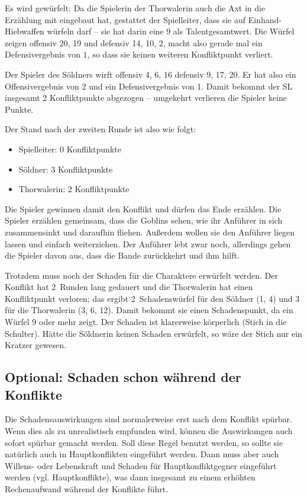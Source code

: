 \begin{beispiel}
\begin{description}
Es wird gewürfelt: Da die Spielerin der Thorwalerin auch die Axt in die Erzählung mit eingebaut hat, gestattet der Spielleiter, dass sie auf Einhand-Hiebwaffen würfeln darf -- sie hat darin eine 9 als Talentgesamtwert. Die Würfel zeigen offensiv 20, 19 und defensiv 14, 10, 2, macht also gerade mal ein Defensivergebnis von $1$, so dass sie keinen weiteren Konfliktpunkt verliert.

Der Spieler des Söldners wirft offensiv 4, 6, 16 defensiv 9, 17, 20. Er hat also ein Offensivergebnis von 2 und ein Defensivergebnis von 1. Damit bekommt der SL insgesamt 2 Konfliktpunkte abgezogen -- umgekehrt verlieren die Spieler keine Punkte.

Der Stand nach der zweiten Runde ist also wie folgt:
\begin{itemize}
\item Spielleiter: 0 Konfliktpunkte
\item Söldner: 3 Konfliktpunkte
\item Thorwalerin: 2 Konfliktpunkte
\end{itemize}
\end{description}

Die Spieler gewinnen damit den Konflikt und dürfen das Ende erzählen. Die Spieler erzählen gemeinsam, dass die Goblins sehen, wie ihr Anführer in sich zusammensinkt und daraufhin fliehen. Außerdem wollen sie den Anführer liegen lassen und einfach weiterziehen. Der Anführer lebt zwar noch, allerdings gehen die Spieler davon aus, dass die Bande zurückkehrt und ihm hilft.

Trotzdem muss noch der Schaden für die Charaktere erwürfelt werden. Der Konflikt hat 2~Runden lang gedauert und die Thorwalerin hat einen Konfliktpunkt verloren; das ergibt 2~Schadenswürfel für den Söldner (1, 4) und 3 für die Thorwalerin (3, 6, 12). Damit bekommt sie einen Schadenspunkt, da ein Würfel 9 oder mehr zeigt. Der Schaden ist klarerweise körperlich (Stich in die Schulter). Hätte die Söldnerin keinen Schaden erwürfelt, so wäre der Stich nur ein Kratzer gewesen.
\end{beispiel}

\begin{optional}
\section{Optional: Schaden schon während der Konflikte}
Die Schadensauswirkungen sind normalerweise erst nach dem Konflikt spürbar. Wenn dies als zu unrealistisch empfunden wird, können die Auswirkungen auch sofort spürbar gemacht werden. Soll diese Regel benutzt werden, so sollte sie natürlich auch in Hauptkonflikten eingeführt werden. Dann muss aber auch Willens- oder Lebenskraft und Schaden für Hauptkonfliktgegner eingeführt werden (vgl. Hauptkonflikte), was dann insgesamt zu einem erhöhten Rechenaufwand während der Konflikte führt.
\end{optional}

